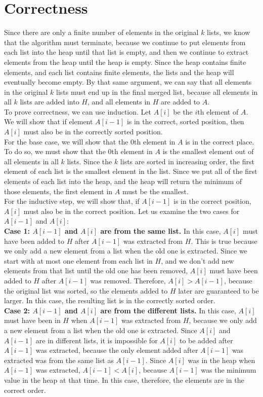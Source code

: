 \documentclass[12pt]{article}
\begin{document}
\section*{Correctness}
Since there are only a finite number of elements in the original $k$ lists, we know that the algorithm must terminate, because we continue to put elements from each list into the heap until that list is empty, and then we continue to extract elements from the heap until the heap is empty. Since the heap contains finite elements, and each list contains finite elements, the lists and the heap will eventually become empty. By that same argument, we can say that all elements in the original $k$ lists must end up in the final merged list, because all elements in all $k$ lists are added into $H$, and all elements in $H$ are added to $A$.\\
To prove correctness, we can use induction. Let $A[i]$ be the $i$th element of $A$. We will show that if element $A[i-1]$ is in the correct, sorted position, then $A[i]$ must also be in the correctly sorted position.\\
For the base case, we will show that the $0$th element in $A$ is in the correct place. To do so, we must show that the $0$th element in $A$ is the smallest element out of all elements in all $k$ lists. Since the $k$ lists are sorted in increasing order, the first element of each list is the smallest element in the list. Since we put all of the first elements of each list into the heap, and the heap will return the minimum of those elements, the first element in $A$ must be the smallest.\\
For the inductive step, we will show that, if $A[i-1]$ is in the correct position, $A[i]$ must also be in the correct position. Let us examine the two cases for $A[i-1]$ and $A[i]$:\\
\textbf{Case 1: $A[i-1]$ and $A[i]$ are from the same list.} In this case, $A[i]$ must have been added to $H$ after $A[i-1]$ was extracted from $H$. This is true because we only add a new element from a list when the old one is extracted. Since we start with at most one element from each list in $H$, and we don't add new elements from that list until the old one has been removed, $A[i]$ must have been added to $H$ after $A[i-1]$ was removed. Therefore, $A[i] > A[i-1]$, because the original list was sorted, so the elements added to $H$ later are guaranteed to be larger. In this case, the resulting list is in the correctly sorted order.\\
\textbf{Case 2: $A[i-1]$ and $A[i]$ are from the different lists.} In this case, $A[i]$ must have been in $H$ when $A[i-1]$ was extracted from $H$, because we only add a new element from a list when the old one is extracted. Since $A[i]$ and $A[i-1]$ are in different lists, it is impossible for $A[i]$ to be added after $A[i-1]$ was extracted, because the only element added after $A[i-1]$ was extracted was from the same list as $A[i-1]$. Since $A[i]$ was in the heap when $A[i-1]$ was extracted, $A[i-1] < A[i]$, because $A[i-1]$ was the minimum value in the heap at that time. In this case, therefore, the elements are in the correct order.\\
\end{document}
